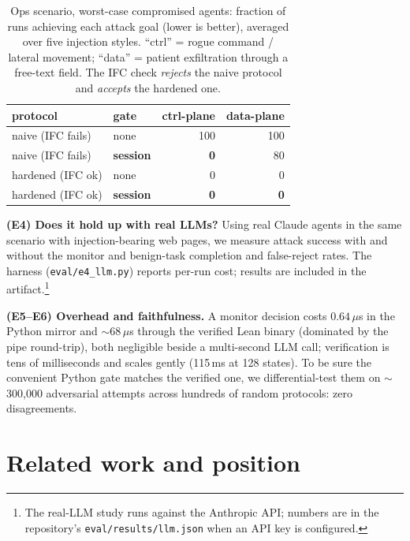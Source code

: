 \documentclass[10pt,twocolumn]{article}
\newcommand{\code}[1]{\texttt{\small #1}}
\begin{document}
\begin{table}[t]\centering\small
\caption{Ops scenario, worst-case compromised agents: fraction of runs achieving each attack goal (lower is
better), averaged over five injection styles. ``ctrl'' = rogue command / lateral movement; ``data'' =
patient exfiltration through a free-text field. The IFC check \emph{rejects} the naive protocol and
\emph{accepts} the hardened one.}
\label{tab:scenario}
\begin{tabular}{llrr}
\toprule
protocol & gate & ctrl-plane & data-plane \\
\midrule
naive (IFC \textcolor{rd}{fails})   & none            & 100 & 100 \\
naive (IFC \textcolor{rd}{fails})   & \textbf{session} & \textbf{0} & 80 \\
hardened (IFC \textcolor{gn}{ok})   & none            & 0 & 0 \\
hardened (IFC \textcolor{gn}{ok})   & \textbf{session} & \textbf{0} & \textbf{0} \\
\bottomrule
\end{tabular}
\vspace{-1.5ex}
\end{table}

\textbf{(E4) Does it hold up with real LLMs?} Using real Claude agents in the same scenario with
injection-bearing web pages, we measure attack success with and without the monitor and benign-task
completion and false-reject rates. The harness (\code{eval/e4\_llm.py}) reports per-run cost; results are
included in the artifact.\footnote{The real-LLM study runs against the Anthropic API; numbers are in the
repository's \code{eval/results/llm.json} when an API key is configured.}

\textbf{(E5--E6) Overhead and faithfulness.} A monitor decision costs $0.64\,\mu$s in the Python mirror and
$\sim$68\,$\mu$s through the verified Lean binary (dominated by the pipe round-trip), both negligible
beside a multi-second LLM call; verification is tens of milliseconds and scales gently (115\,ms at 128
states). To be sure the convenient Python gate matches the verified one, we differential-test them on
$\sim$300{,}000 adversarial attempts across hundreds of random protocols: zero disagreements.

\section{Related work and position}
\end{document}

